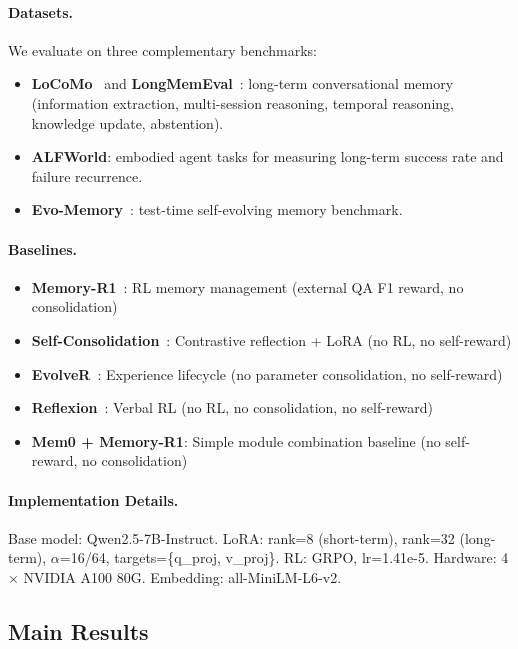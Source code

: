 \documentclass{article}
\begin{document}
\paragraph{Datasets.} We evaluate on three complementary benchmarks:
\begin{itemize}[nosep, leftmargin=*]
    \item \textbf{LoCoMo}~\citep{chen2025memoryr1} and \textbf{LongMemEval}~\citep{bai2024longmemeval}: long-term conversational memory (information extraction, multi-session reasoning, temporal reasoning, knowledge update, abstention).
    \item \textbf{ALFWorld}: embodied agent tasks for measuring long-term success rate and failure recurrence.
    \item \textbf{Evo-Memory}~\citep{evomemory2025}: test-time self-evolving memory benchmark.
\end{itemize}

\paragraph{Baselines.}
\begin{itemize}[nosep, leftmargin=*]
    \item \textbf{Memory-R1}~\citep{chen2025memoryr1}: RL memory management (external QA F1 reward, no consolidation)
    \item \textbf{Self-Consolidation}~\citep{zhang2026selfconsolidation}: Contrastive reflection + LoRA (no RL, no self-reward)
    \item \textbf{EvolveR}~\citep{evolver2025}: Experience lifecycle (no parameter consolidation, no self-reward)
    \item \textbf{Reflexion}~\citep{shinn2023reflexion}: Verbal RL (no RL, no consolidation, no self-reward)
    \item \textbf{Mem0 + Memory-R1}: Simple module combination baseline (no self-reward, no consolidation)
\end{itemize}

\paragraph{Implementation Details.}
Base model: Qwen2.5-7B-Instruct. LoRA: rank=8 (short-term), rank=32 (long-term), $\alpha$=16/64, targets=\{q\_proj, v\_proj\}. RL: GRPO, lr=1.41e-5. Hardware: 4$\times$ NVIDIA A100 80G. Embedding: all-MiniLM-L6-v2.

\subsection{Main Results}
\end{document}
